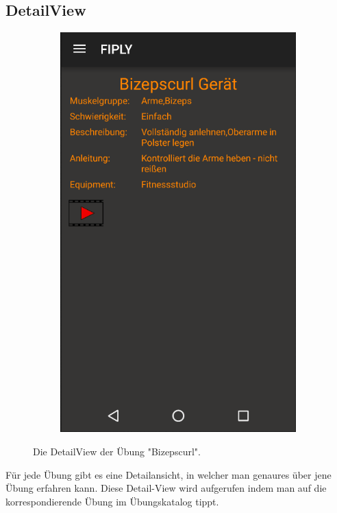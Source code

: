 \documentclass[FIPLY_base.tex]{subfiles}
\begin{document}
\subsection{DetailView}
\begin{figure}[H]
	\begin{subfigure}[b]{0.3\textwidth}
	\includegraphics[scale=0.55]{img/Uebungskatalog_detail}
	\end{subfigure}
	\hfil
	\caption{Die DetailView der Übung "Bizepscurl".}
\end{figure}



Für jede Übung gibt es eine Detailansicht, in welcher man genaures über jene Übung erfahren kann.
Diese Detail-View wird aufgerufen indem man auf die korrespondierende Übung im Übungskatalog tippt.
\end{document}
